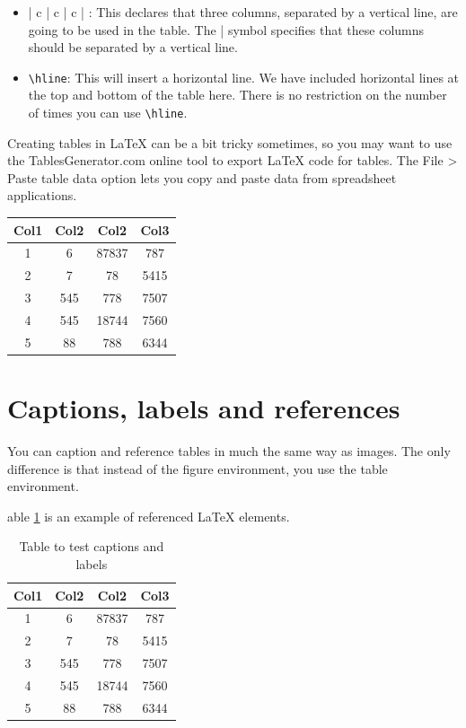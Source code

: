 \documentclass[12pt, a4paper]{report}
\begin{document}
\begin{itemize}
    \item { | c | c | c | }: This declares that three columns, separated by a vertical line, are going to be used in the table. The | symbol specifies that these columns should be separated by a vertical line.
    \item \verb|\hline|: This will insert a horizontal line. We have included horizontal lines at the top and bottom of the table here. There is no restriction on the number of times you can use \verb|\hline|.
\end{itemize}

Creating tables in LaTeX can be a bit tricky sometimes, so you may want to use the TablesGenerator.com online tool to export LaTeX code for tables. The File > Paste table data option lets you copy and paste data from spreadsheet applications.

\begin{center}
    \begin{tabular}{||c c c c||}
        \hline
        Col1 & Col2 & Col2  & Col3 \\ [0.5ex]
        \hline\hline
        1    & 6    & 87837 & 787  \\
        \hline
        2    & 7    & 78    & 5415 \\
        \hline
        3    & 545  & 778   & 7507 \\
        \hline
        4    & 545  & 18744 & 7560 \\
        \hline
        5    & 88   & 788   & 6344 \\ [1ex]
        \hline
    \end{tabular}
\end{center}

\section{Captions, labels and references}

You can caption and reference tables in much the same way as images. The only difference is that instead of the figure environment, you use the table environment.

able \ref{table:data} is an example of referenced \LaTeX{} elements.

\begin{table}[h!]
    \centering
    \begin{tabular}{||c c c c||}
        \hline
        Col1 & Col2 & Col2  & Col3 \\ [0.5ex]
        \hline\hline
        1    & 6    & 87837 & 787  \\
        2    & 7    & 78    & 5415 \\
        3    & 545  & 778   & 7507 \\
        4    & 545  & 18744 & 7560 \\
        5    & 88   & 788   & 6344 \\ [1ex]
        \hline
    \end{tabular}
    \caption{Table to test captions and labels}
    \label{table:data}
\end{table}
\end{document}
